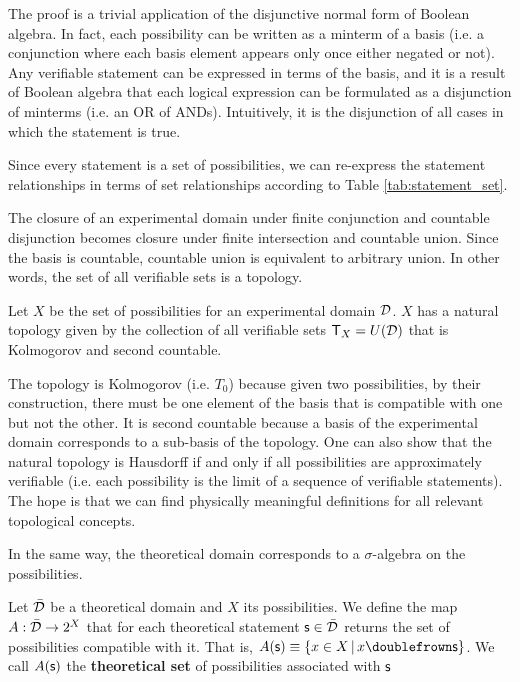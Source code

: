 \documentclass[letterpaper]{article}
\begin{document}
The proof is a trivial application of the disjunctive normal form of Boolean algebra. In fact, each possibility can be written as a minterm of a basis (i.e. a conjunction where each basis element appears only once either negated or not). Any verifiable statement can be expressed in terms of the basis, and it is a result of Boolean algebra that each logical expression can be formulated as a disjunction of minterms (i.e. an OR of ANDs). Intuitively, it is the disjunction of all cases in which the statement is true.

Since every statement is a set of possibilities, we can re-express the statement relationships in terms of set relationships according to Table \ref{tab:statement_set}.

The closure of an experimental domain under finite conjunction and countable disjunction becomes closure under finite intersection and countable union. Since the basis is countable, countable union is equivalent to arbitrary union. In other words, the set of all verifiable sets is a topology.

\begin{thrm}
	Let $X$ be the set of possibilities for an experimental domain $\mathcal{D}$. $X$ has a natural topology given by the collection of all verifiable sets $\mathsf{T}_X=U(\mathcal{D})$ that is Kolmogorov and second countable.
\end{thrm}

The topology is Kolmogorov (i.e. $T_0$) because given two possibilities, by their construction, there must be one element of the basis that is compatible with one but not the other. It is second countable because a basis of the experimental domain corresponds to a sub-basis of the topology. One can also show that the natural topology is Hausdorff if and only if all possibilities are approximately verifiable (i.e. each possibility is the limit of a sequence of verifiable statements). The hope is that we can find physically meaningful definitions for all relevant topological concepts.

In the same way, the theoretical domain corresponds to a $\sigma$-algebra on the possibilities.

\begin{defn}
	Let $\bar{\mathcal{D}}$ be a theoretical domain and $X$ its possibilities. We define the map $A : \bar{\mathcal{D}} \rightarrow 2^X$ that for each theoretical statement $\mathsf{s} \in \bar{\mathcal{D}}$ returns the set of possibilities compatible with it. That is, $A(\stmt)\equiv\{ x \in X \, | \, x \comp \stmt\}$. We call $A(\mathsf{s})$ the \textbf{theoretical set} of possibilities associated with $\mathsf{s}$
\end{defn}
\end{document}
